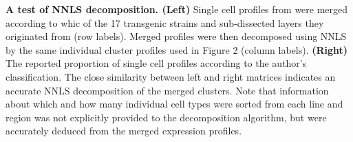 \textbf{A test of NNLS decomposition. (Left)} Single cell profiles from \cite{Tasic_2016} were merged according to whic of the 17 transgenic strains and sub-dissected layers they originated from (row labels). Merged profiles were then decomposed using NNLS by the same individual cluster profiles used in Figure 2 (column labels). \textbf{(Right)} The reported proportion of single cell profiles according to the author's classification. The close similarity between left and right matrices indicates an accurate NNLS decomposition of the merged clusters. Note that information about which and how many individual cell types were sorted from each line and region was not explicitly provided to the decomposition algorithm, but were accurately deduced from the merged expression profiles.